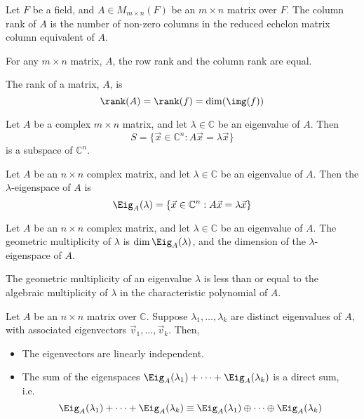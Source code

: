 \begin{definition}
  Let $F$ be a field, and $A \in M_{m \times n}(F)$ be an $m \times n$
  matrix over $F$. The column rank of $A$ is the number of non-zero
  columns in the reduced echelon matrix column equivalent of $A$.
\end{definition}
\begin{lemma}
  For any $m \times n$ matrix, $A$, the row rank and the column rank are equal.
\end{lemma}
\begin{definition}
  The rank of a matrix, $A$, is \[ \rank(A) = \rank(f) =
  \dim(\img(f)) \]
\end{definition}
\begin{lemma}
  Let $A$ be a complex $m \times n$ matrix, and let $\lambda \in
  \mathbb{C}$ be an eigenvalue of $A$. Then
  \[ S = \{ \vec{x} \in \mathbb{C}^n : A \vec{x} = \lambda \vec{x}
  \} \] is a subspace of $\mathbb{C}^n$.
\end{lemma}
\begin{definition}[Eigenspace]
  Let $A$ be an $n \times n$ complex matrix, and let $\lambda \in
  \mathbb{C}$ be an eigenvalue of $A$. Then the $\lambda$-eigenspace
  of $A$ is \[ \Eig_A(\lambda) = \{ \vec{x} \in \mathbb{C}^n : A
  \vec{x} = \lambda \vec{x} \}\]
\end{definition}
\begin{definition}
  Let $A$ be an $n \times n$ complex matrix, and let $\lambda \in
  \mathbb{C}$ be an eigenvalue of $A$. The geometric multiplicity of
  $\lambda$ is $\dim \Eig_A(\lambda)$, and the dimension of the
  $\lambda$-eigenspace of $A$.
\end{definition}
\begin{lemma}
  The geometric multiplicity of an eigenvalue $\lambda$ is less than
  or equal to the algebraic multiplicity of $\lambda$ in the
  characteristic polynomial of $A$.
\end{lemma}
\begin{lemma}
  Let $A$ be an $n \times n$ matrix over $\mathbb{C}$. Suppose
  $\lambda_1, \dots, \lambda_k$ are distinct eigenvalues of $A$, with
  associated eigenvectors $\vec{v}_1, \dots, \vec{v}_k$. Then,
  \begin{itemize}
  \item The eigenvectors are linearly independent.
  \item The sum of the eigenspaces $\Eig_A(\lambda_1) + \cdots +
    \Eig_A(\lambda_k)$ is a direct sum, i.e.\ 
    \[ \Eig_A(\lambda_1) + \cdots + \Eig_A(\lambda_k) \equiv
    \Eig_A(\lambda_1) \oplus \cdots \oplus \Eig_A(\lambda_k) \]
  \end{itemize}
\end{lemma}

